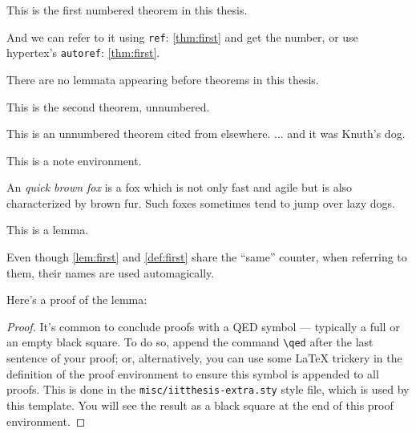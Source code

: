 \begin{theorem}
\label{thm:first}
This is the first numbered theorem in this thesis.
\end{theorem}

And we can refer to it using \texttt{ref}: \ref{thm:first} and get the number, or use hypertex's \texttt{autoref}: \autoref{thm:first}.

\begin{corollary}
\label{cor:first}
There are no lemmata appearing before theorems in this thesis.
\end{corollary}

\begin{theorem*}
This is the second theorem, unnumbered.
\end{theorem*}

\begin{theorem*}
This is an unnumbered theorem cited from elsewhere.  ... and it was Knuth's dog.
\end{theorem*}

\begin{note}
This is a note environment.  
\end{note}

\begin{definition}
\label{def:first}
An \emph{quick brown fox} is a fox which is not only fast and agile but is also characterized by brown fur. Such foxes sometimes tend to jump over lazy dogs.
\end{definition}

\begin{lemma}
\label{lem:first}
This is a lemma. 
\end{lemma}

Even though \autoref{lem:first} and \autoref{def:first} share the ``same'' counter, when referring to them, their names are used automagically.

Here's a proof of the lemma:
\begin{proof}%
\lipsum[2]
	It's common to conclude proofs with a QED symbol --- typically a full or an empty black square. To do so, append the command \verb|\qed| after the last sentence of your proof; or, alternatively, you can use some \LaTeX{} trickery in the definition of the proof environment to ensure this symbol is appended to all proofs. This is done in the \texttt{misc/iitthesis-extra.sty} style file, which is used by this template. You will see the result as a black square at the end of this proof environment.
\end{proof}

